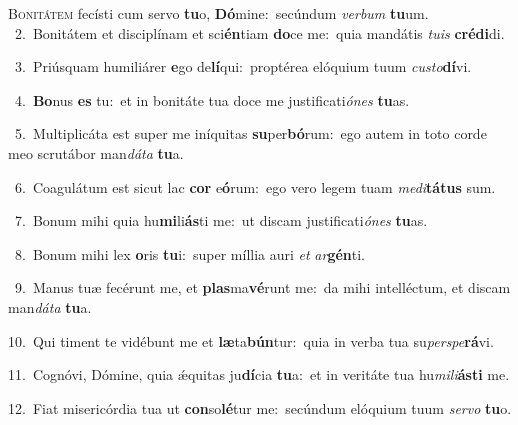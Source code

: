 \lettrine{\initial\textcolor{\initialcolor}{B}}{onitátem} fecísti cum servo \textbf{tu}\-o, \textbf{Dó}\-mine:~\star secúndum \textit{ver}\-\textit{bum} \textbf{tu}\-um.\\
{\numbfont\textcolor{\numbcolor}{~2.}}~Bonitátem et disciplínam et sci\-\textbf{én}\-tiam \textbf{do}\-ce me:~\star quia mandátis \textit{tu}\-\textit{is} \textbf{cré}\-\textbf{di}di.\par
{\numbfont\textcolor{\numbcolor}{~3.}}~Priúsquam humiliárer \textbf{e}\-go de\-\textbf{lí}\-qui:~\star proptérea elóquium tuum \textit{cus}\-\textit{to}\textbf{dí}vi.\par
{\numbfont\textcolor{\numbcolor}{~4.}}~\-\textbf{Bo}\-nus \textbf{es} tu:~\star et in bonitáte tua doce me justificati\-\textit{ó}\-\textit{nes} \textbf{tu}\-as.\par
{\numbfont\textcolor{\numbcolor}{~5.}}~Multiplicáta est super me iníquitas \textbf{su}\-per\-\textbf{bó}\-rum:~\star ego autem in toto corde meo scrutábor man\-\textit{dá}\-\textit{ta} \textbf{tu}\-a.\par
{\numbfont\textcolor{\numbcolor}{~6.}}~Coagulátum est sicut lac \textbf{cor} e\-\textbf{ó}\-rum:~\star ego vero legem tuam \textit{me}\-\textit{di}\textbf{tá}\textbf{tus} sum.\par
{\numbfont\textcolor{\numbcolor}{~7.}}~Bonum mihi quia hu\-\textbf{mi}\-li\-\textbf{ás}\-ti me:~\star ut discam justificati\-\textit{ó}\-\textit{nes} \textbf{tu}\-as.\par
{\numbfont\textcolor{\numbcolor}{~8.}}~Bonum mihi lex \textbf{o}\-ris \textbf{tu}\-i:~\star super míllia auri \textit{et} \textit{ar}\-\textbf{gén}ti.\par
{\numbfont\textcolor{\numbcolor}{~9.}}~Manus tuæ fecérunt me, et \textbf{plas}\-ma\-\textbf{vé}\-runt me:~\star da mihi intelléctum, et discam man\-\textit{dá}\-\textit{ta} \textbf{tu}\-a.\par
{\numbfont\textcolor{\numbcolor}{10.}}~Qui timent te vidébunt me et \textbf{læ}\-ta\-\textbf{bún}\-tur:~\star quia in verba tua su\-\textit{per}\-\textit{spe}\textbf{rá}vi.\par
{\numbfont\textcolor{\numbcolor}{11.}}~Cognóvi, Dómine, quia ǽquitas ju\-\textbf{dí}\-cia \textbf{tu}\-a:~\star et in veritáte tua hu\-\textit{mi}\-\textit{li}\textbf{ás}\textbf{ti} me.\par
{\numbfont\textcolor{\numbcolor}{12.}}~Fiat misericórdia tua ut \textbf{con}\-so\-\textbf{lé}\-tur me:~\star secúndum elóquium tuum \textit{ser}\-\textit{vo} \textbf{tu}\-o.\par
